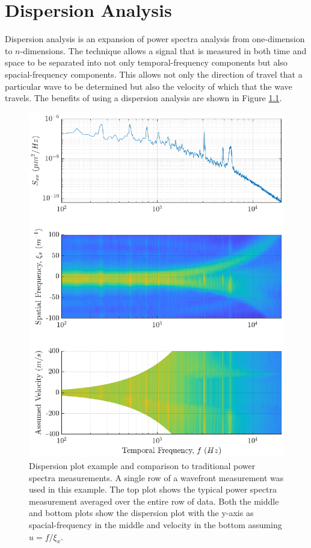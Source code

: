 
\chapter{Dispersion Analysis}
Dispersion analysis is an expansion of power spectra analysis from one-dimension to $n$-dimensions.
The technique allows a signal that is measured in both time and space to be separated into not only temporal-frequency components but also spacial-frequency components.
This allows not only the direction of travel that a particular wave to be determined but also the velocity of which that the wave travels.
The benefits of using a dispersion analysis are shown in Figure \ref{fig:04_dispersion_demo}.
\begin{figure}
\centering
  \includegraphics{../matlab/04_dispersion_analysis/dispersion_demo.eps}
  \caption{Dispersion plot example and comparison to traditional power spectra measurements. A single row of a wavefront measurement was used in this example. The top plot shows the typical power spectra measurement averaged over the entire row of data. Both the middle and bottom plots show the dispersion plot with the y-axis as spacial-frequency in the middle and velocity in the bottom assuming $u=f/\xi_x$.}
  \label{fig:04_dispersion_demo}
\end{figure}
